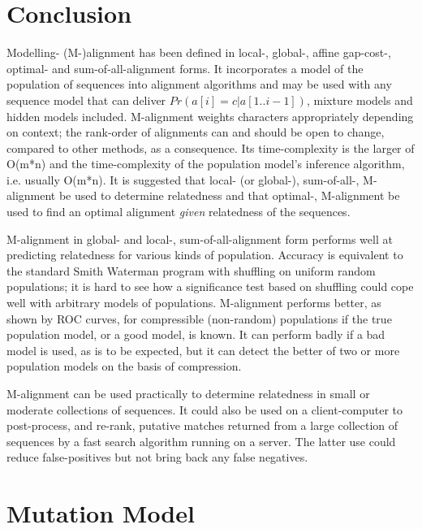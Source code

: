 \documentclass[letterpaper,11pt,oneside]{article}
\begin{document}
\section{Conclusion}
\label{sec:conc}


Modelling- (M-)alignment has been defined in local-, global-, affine
gap-cost-, optimal- and sum-of-all-alignment forms.  It incorporates a model
of the population of sequences into alignment algorithms and may be used with
any sequence model that can deliver $Pr(a[i]=c|a[1..i-1])$, mixture models and
hidden models included.  M-alignment weights characters appropriately
depending on context; the rank-order of alignments can and should be open to
change, compared to other methods, as a consequence.  Its time-complexity is
the larger of O(m*n) and the time-complexity of the population model's
inference algorithm, i.e. usually O(m*n).  It is suggested that local- (or
global-), sum-of-all-, M-alignment be used to determine relatedness and that
optimal-, M-alignment be used to find an optimal alignment {\em given}
relatedness of the sequences.

M-alignment in global- and local-, sum-of-all-alignment form performs well
at predicting relatedness for various kinds of population.
Accuracy is equivalent to the standard Smith Waterman program with shuffling
on uniform random populations;
it is hard to see how a significance test based on shuffling could
cope well with arbitrary models of populations.
M-alignment performs better, as shown by ROC curves,
for compressible (non-random) populations if the true
population model, or a good model, is known.
It can perform badly if a bad model is used, as is to be expected,
but it can detect the better of two or more population models
on the basis of compression.

M-alignment can be used practically to determine relatedness
in small or moderate collections of sequences.
It could also be used on a client-computer to post-process, and re-rank,
putative matches returned from a large collection of sequences
by a fast search algorithm running on a server.
The latter use could reduce false-positives but not bring back
any false negatives.




%
\small

\normalsize


\appendix
\section{Mutation Model}
\label{sec:mutations}
\end{document}
